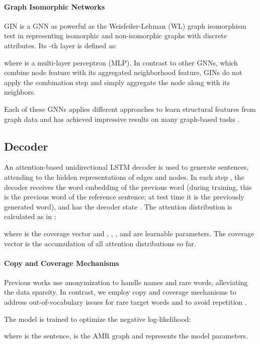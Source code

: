 \documentclass[11pt,a4paper]{article}
\begin{document}
\paragraph{Graph Isomorphic Networks}
GIN is a GNN as powerful as the Weisfeiler-Lehman (WL) graph isomorphism test \cite{weisfeiler} in representing isomorphic and non-isomorphic graphs with discrete attributes. Its -th layer is defined as:

where  is a multi-layer perceptron (MLP). In contrast to other GNNs, which combine node feature with its aggregated neighborhood feature, GINs do not apply the combination step and simply aggregate the node along with its neighbors.

Each of these GNNs applies different approaches to learn structural features from graph data and has achieved impressive results on many graph-based tasks \cite{Li2016GatedGS, velickovic2018graph, xu2018how}.



\subsection{Decoder}

An attention-based unidirectional LSTM decoder is used to generate sentences, attending to the hidden representations of edges and nodes. In each step , the decoder receives the word embedding of the previous word (during training, this is the previous word of the reference sentence; at test time it is the previously generated word), and has the decoder state . The attention distribution  is calculated as in \citet{see-etal-2017-get}:

where  is the coverage vector and , , ,  and  are learnable parameters. The coverage vector is the accumulation of all attention distributions so far.

\paragraph{Copy and Coverage Mechanisms}
Previous works \cite{damonte_naacl18, cao_naacl19} use anonymization to handle names and rare words, alleviating the data sparsity. In contrast, we employ copy and coverage mechanisms to address out-of-vocabulary issues for rare target words and to avoid repetition \cite{see-etal-2017-get}.

The model is trained to optimize the negative log-likelihood:

where  is the sentence,  is the AMR graph and  represents the model parameters.
\end{document}
